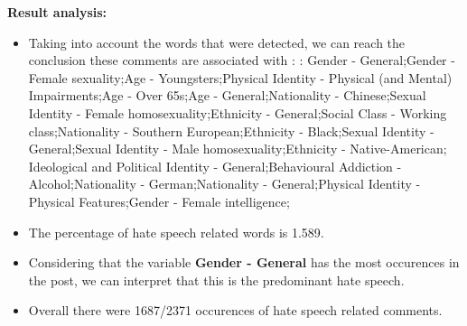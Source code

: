 \documentclass[11pt]{article}
\begin{document}
\textbf{\Large Result analysis:}

\begin{itemize}\item Taking into account the words that were detected, we can reach the conclusion these comments are associated with : : Gender - General;Gender - Female sexuality;Age - Youngsters;Physical Identity - Physical (and Mental) Impairments;Age - Over 65s;Age - General;Nationality - Chinese;Sexual Identity - Female homosexuality;Ethnicity - General;Social Class - Working class;Nationality - Southern European;Ethnicity - Black;Sexual Identity - General;Sexual Identity - Male homosexuality;Ethnicity - Native-American; Ideological and Political Identity - General;Behavioural Addiction - Alcohol;Nationality - German;Nationality - General;Physical Identity - Physical Features;Gender - Female intelligence;%

\item The percentage of hate speech related words is 1.589.

\item Considering that the variable \textbf{Gender - General} has the most occurences in the post, we can interpret that this is the predominant hate speech.

\item Overall there were 1687/2371 occurences of hate speech related comments.\end{itemize}
\end{document}
